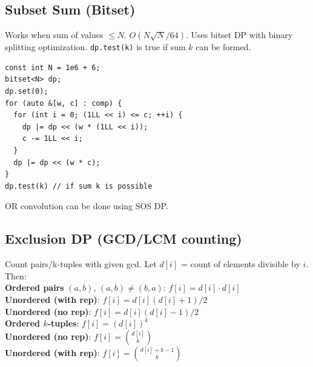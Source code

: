 \subsection{Subset Sum (Bitset)}
Works when sum of values $\le N$. $O(N \sqrt{N} / 64)$.
Uses bitset DP with binary splitting optimization.
\texttt{dp.test(k)} is true if sum $k$ can be formed.
\begin{verbatim}
const int N = 1e6 + 6;
bitset<N> dp;
dp.set(0);
for (auto &[w, c] : comp) {
  for (int i = 0; (1LL << i) <= c; ++i) {
    dp |= dp << (w * (1LL << i));
    c -= 1LL << i;
  }
  dp |= dp << (w * c);
}
dp.test(k) // if sum k is possible
\end{verbatim}
OR convolution can be done using SOS DP.
\subsection{Exclusion DP (GCD/LCM counting)}
Count pairs/k-tuples with given gcd. Let $d[i]$ = count of elements divisible by $i$. Then: \\
\textbf{Ordered pairs} $(a,b)$, $(a,b) \neq (b,a)$: $f[i] = d[i] \cdot d[i]$ \\
\textbf{Unordered (with rep)}: $f[i] = d[i](d[i]+1)/2$ \\
\textbf{Unordered (no rep)}: $f[i] = d[i](d[i]-1)/2$ \\
\textbf{Ordered $k$-tuples}: $f[i] = (d[i])^k$ \\
\textbf{Unordered (no rep)}: $f[i] = \binom{d[i]}{k}$ \\
\textbf{Unordered (with rep)}: $f[i] = \binom{d[i]+k-1}{k}$


